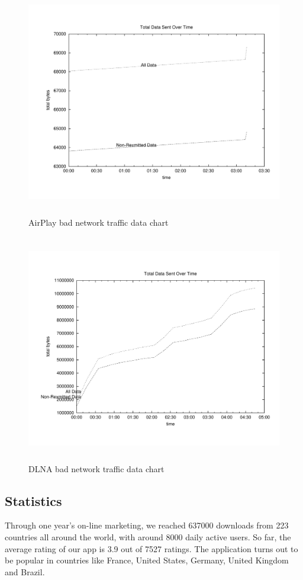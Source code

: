\begin{figure}[htb]
\centering \includegraphics[height=10cm]{charts/AirPlay_traffic_15loss_data}
\caption{AirPlay bad network traffic data chart \label{chart6}}
\end{figure}
\begin{figure}[htb]
\centering \includegraphics[height=10cm]{charts/dlna_traffic_15loss_data}
\caption{DLNA bad network traffic data chart \label{chart6}}
\end{figure}

\subsection{Statistics}
Through one year's on-line marketing, we reached 637000 downloads from 223
countries all around the world, with around 8000 daily active users. So far, the
average rating of our app is 3.9 out of 7527 ratings. The application turns out
to be popular in countries like France, United States, Germany, United Kingdom
and Brazil.

